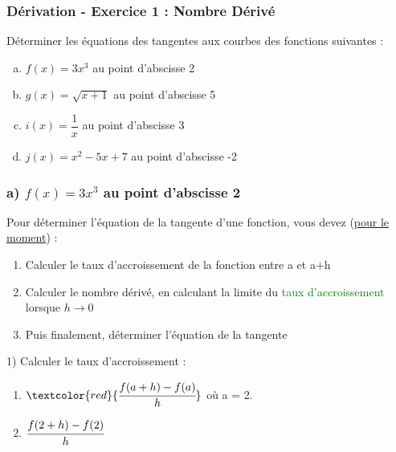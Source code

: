 \documentclass[t]{beamer}
\begin{document}
	\begin{frame}[label=pagebanale]
		\frametitle{Dérivation - Exercice 1 : Nombre Dérivé}
		\pause
		Déterminer les équations des tangentes aux courbes des fonctions suivantes :
		\pause
		\begin{enumerate}[a)]
			\item<+-> $f(x) = 3x^3$ au point d'abscisse 2
			\item<+-> $g(x) = \sqrt{x+1}$ au point d'abscisse 5
			\item<+-> $i(x) = \dfrac{1}{x}$ au point d'abscisse 3
			\item<+-> $j(x) = x^2 - 5x +7$ au point d'abscisse -2
		\end{enumerate}
	\end{frame}

	\begin{frame}
		\frametitle{a) $f(x) = 3x^3$ au point d'abscisse 2}
		\pause
		\begin{block}{}
			Pour déterminer l'équation de la tangente d'une fonction, vous devez (\underline{pour le moment}) :
			\pause
			\begin{enumerate}[1.]
				\item Calculer le taux d'accroissement de la fonction entre a et a+h
				\pause
				\item Calculer le nombre dérivé, \pause en calculant la limite du \textcolor{green}{taux d'accroissement} lorsque $h \rightarrow 0$
				\pause
				\item Puis finalement, déterminer l'équation de la tangente
			\end{enumerate}
		\end{block}
		\pause
		\begin{block}{1) Calculer le taux d'accroissement :}
			\pause
			\begin{enumerate}[]
				\item<+-> $\textcolor{red}{\cfrac{f(a+h)-f(a)}{h}}$ où a = 2.
				\item<+-> \(\cfrac{f(2+h)-f(2)}{h} \)
			\end{enumerate}
		\end{block}
	\end{frame}
\end{document}
